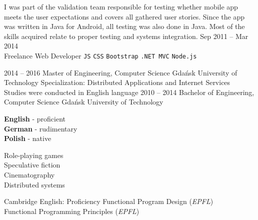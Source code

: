 \documentclass[9pt]{style/developercv}
\begin{document}
\begin{entrylist}
{			I was part of the validation team responsible for testing whether 
			mobile app meets the user expectations and covers all gathered user 
			stories. Since the app was written in  Java for Android, all testing 
			was also done in Java. Most of the skills acquired relate to proper 
			testing and systems integration.
		}
	\entry
		{Sep 2011 -- Mar 2014\\\footnotesize{Freelance}}
		{Web Developer}
		{}
		{
			\texttt{JS}\slashsep
			\texttt{CSS}\slashsep
			\texttt{Bootstrap}\slashsep
			\texttt{.NET MVC}\slashsep
			\texttt{Node.js}\\
		}
\end{entrylist}



\begin{entrylist}
	\entry
		{2014 -- 2016}
		{Master of Engineering, Computer Science}
		{Gdańsk University of Technology}
		{
			Specialization: Distributed Applications and Internet Services \\
			Studies were conducted in English language
		}
	\entry
		{2010 -- 2014}
		{Bachelor of Engineering, Computer Science}
		{Gdańsk University of Technology}
		{}
\end{entrylist}


\begin{minipage}[t]{0.3\textwidth}
	\vspace{-\baselineskip}


	\textbf{English} - proficient\\
	\textbf{German} - rudimentary\\
	\textbf{Polish} - native
\end{minipage}
\hfill
\begin{minipage}[t]{0.3\textwidth}
	\vspace{-\baselineskip}
	
	
	Role-playing games\\
	Speculative fiction\\
	Cinematography\\
	Distributed systems
\end{minipage}
\hfill
\begin{minipage}[t]{0.3\textwidth}
	\vspace{-\baselineskip}
	
	
	Cambridge English: Proficiency
	Functional Program Design (\textit{EPFL})\\
	Functional Programming Principles (\textit{EPFL})
\end{minipage}
\end{document}
